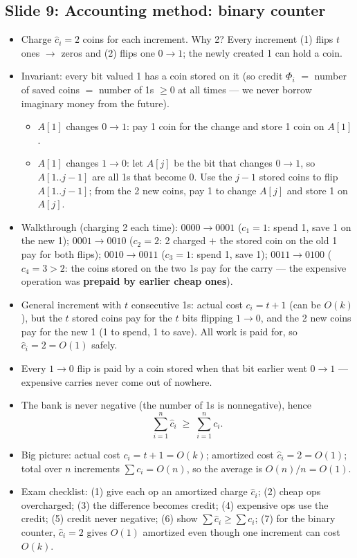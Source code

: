 \documentclass[11pt]{article}
\newcommand{\slide}[2]{\subsection*{Slide #1: #2}}
\begin{document}
\slide{9}{Accounting method: binary counter}
\begin{itemize}
  \item Charge $\hat{c}_i = 2$ coins for each increment. Why 2? Every increment (1) flips $t$ ones $\to$ zeros and (2) flips one $0 \to 1$; the newly created 1 can hold a coin.
  \item Invariant: every bit valued 1 has a coin stored on it (so credit $\Phi_i$ $=$ number of saved coins $=$ number of 1s $\ge 0$ at all times --- we never borrow imaginary money from the future).
  \begin{itemize}
    \item $A[1]$ changes $0 \to 1$: pay 1 coin for the change and store 1 coin on $A[1]$.
    \item $A[1]$ changes $1 \to 0$: let $A[j]$ be the bit that changes $0 \to 1$, so $A[1..j-1]$ are all 1s that become 0. Use the $j-1$ stored coins to flip $A[1..j-1]$; from the 2 new coins, pay 1 to change $A[j]$ and store 1 on $A[j]$.
  \end{itemize}
  \item Walkthrough (charging 2 each time): $0000 \to 0001$ ($c_1 = 1$: spend 1, save 1 on the new 1); $0001 \to 0010$ ($c_2 = 2$: 2 charged $+$ the stored coin on the old 1 pay for both flips); $0010 \to 0011$ ($c_3 = 1$: spend 1, save 1); $0011 \to 0100$ ($c_4 = 3 > 2$: the coins stored on the two 1s pay for the carry --- the expensive operation was \textbf{prepaid by earlier cheap ones}).
  \item General increment with $t$ consecutive 1s: actual cost $c_i = t + 1$ (can be $O(k)$), but the $t$ stored coins pay for the $t$ bits flipping $1 \to 0$, and the 2 new coins pay for the new 1 (1 to spend, 1 to save). All work is paid for, so $\hat{c}_i = 2 = O(1)$ safely.
  \item Every $1 \to 0$ flip is paid by a coin stored when that bit earlier went $0 \to 1$ --- expensive carries never come out of nowhere.
  \item The bank is never negative (the number of 1s is nonnegative), hence
        \[ \sum_{i=1}^{n} \hat{c}_i \;\ge\; \sum_{i=1}^{n} c_i. \]
  \item Big picture: actual cost $c_i = t + 1 = O(k)$; amortized cost $\hat{c}_i = 2 = O(1)$; total over $n$ increments $\sum c_i = O(n)$, so the average is $O(n)/n = O(1)$.
  \item Exam checklist: (1) give each op an amortized charge $\hat{c}_i$; (2) cheap ops overcharged; (3) the difference becomes credit; (4) expensive ops use the credit; (5) credit never negative; (6) show $\sum \hat{c}_i \ge \sum c_i$; (7) for the binary counter, $\hat{c}_i = 2$ gives $O(1)$ amortized even though one increment can cost $O(k)$.
\end{itemize}
\end{document}
